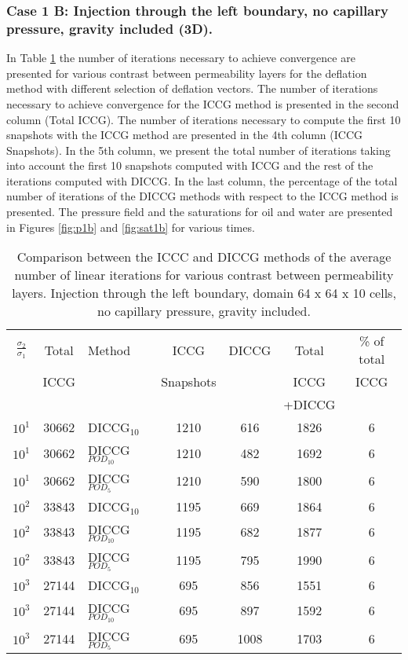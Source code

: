 \documentclass[12pt]{article}
\begin{document}
\subsubsection*{Case 1 B: Injection through the left boundary, no capillary pressure, gravity included (3D).}
In Table \ref{table:liter1b} the number of iterations necessary to achieve convergence are presented for various contrast between permeability layers for the deflation method with different selection of deflation vectors. The number of iterations necessary to achieve convergence for the ICCG method is presented in the second column (Total ICCG). The number of iterations necessary to compute the first 10 snapshots with the ICCG method are presented in the 4th column (ICCG Snapshots). In the 5th column, we present the total number of iterations taking into account the first 10 snapshots computed with ICCG and the rest of the iterations computed with DICCG. In the last column, the percentage of the total number of iterations of the DICCG methods with respect to the ICCG method is presented.   
The pressure field and the saturations for oil and water are presented in Figures \ref{fig:p1b} and \ref{fig:sat1b} for various times.
\begin{table}[!h]\centering
\begin{minipage}{1\textwidth}
 \centering
\begin{tabular}{ ||c|c||l|c|c|c|c||} 
\hline
$\frac{\sigma_2}{\sigma_1}$&Total&Method  & ICCG&DICCG &Total&\% of total\\ 
                           & ICCG     &  & Snapshots& &ICCG& ICCG\\ 
                            &     &  & & &+DICCG& \\
\hline 
$10^{1}$ &30662& DICCG$_{10}$&1210&616&1826&6\\ 
\hline  
$10^{1}$ &30662& DICCG$_{POD_{10}}$&1210&482&1692&6 \\ 
\hline  
$10^{1}$ &30662& DICCG$_{POD_{5}}$&1210&590&1800&6 \\ 
\hline  
$10^{2}$ &33843& DICCG$_{10}$&1195&669&1864&6\\ 
\hline  
$10^{2}$ &33843& DICCG$_{POD_{10}}$&1195&682&1877&6 \\ 
\hline  
$10^{2}$ &33843& DICCG$_{POD_{5}}$&1195&795&1990&6 \\ 
\hline 
$10^{3}$ &27144& DICCG$_{10}$&695&856&1551&6\\ 
\hline  
$10^{3}$ &27144& DICCG$_{POD_{10}}$&695&897&1592&6 \\ 
\hline  
$10^{3}$ &27144& DICCG$_{POD_{5}}$&695&1008&1703&6 \\ 
\hline
\end{tabular} 
\caption{Comparison between the ICCC and DICCG methods of the average number of linear iterations for various contrast between permeability layers. Injection through the left boundary, domain 64 x 64 x 10 cells, no capillary pressure, gravity  included.}\label{table:liter1b} 
\end{minipage}  
\end{table}  
\end{document}
